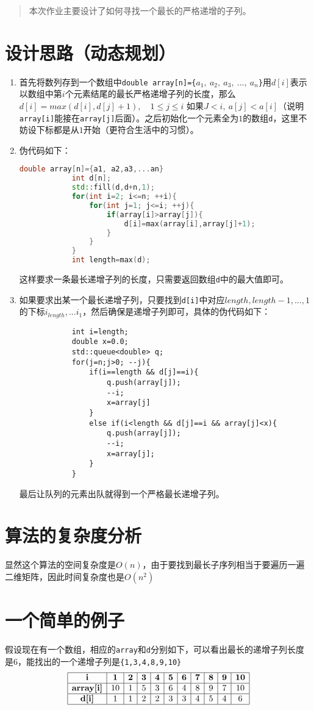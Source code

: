 \documentclass[UTF8]{ctexart}
\begin{document}
	
	\pagestyle{fancy}
	\fancyhead{}
	\rhead{\today}
	\begin{abstract}
		本次作业主要设计了如何寻找一个最长的严格递增的子列。
	\end{abstract}
	\section{设计思路（动态规划）}
	\begin{enumerate}
		\item 首先将数列存到一个数组中\texttt{double array[n]=\{$a_1,\ a_2,\ a_3,\ ...,\ a_n$\}}用$d[i]$表示以数组中第$i$个元素结尾的最长严格递增子列的长度，那么$d[i]=max(d[i],d[j]+1),\quad 1 \le j \le i$ 如果$J<i,\ a[j]<a[i]$（说明\texttt{array[i]}能接在\texttt{array[j]}后面）。之后初始化一个元素全为$1$的数组\texttt{d}，这里不妨设下标都是从$1$开始（更符合生活中的习惯）。
		\item 伪代码如下：
		\begin{lstlisting}[language=C++, caption={找到最长递增子列长度}, label={lst:operators}]
			double array[n]={a1, a2,a3,...an}
			int d[n];
			std::fill(d,d+n,1);
			for(int i=2; i<=n; ++i){
				for(int j=1; j<=i; ++j){
					if(array[i]>array[j]){
						d[i]=max(array[i],array[j]+1);
					}
				}
			}
			int length=max(d);
		\end{lstlisting}
		这样要求一条最长递增子列的长度，只需要返回数组\texttt{d}中的最大值即可。
		\item 如果要求出某一个最长递增子列，只要找到\texttt{d[i]}中对应$length,length-1,...,1$的下标$i_{length},...i_1$，然后确保是递增子列即可，具体的伪代码如下：
		\begin{lstlisting}
			int i=length;
			double x=0.0;
			std::queue<double> q;
			for(j=n;j>0; --j){
				if(i==length && d[j]==i){
					q.push(array[j]);
					--i;
					x=array[j]
				}
				else if(i<length && d[j]==i && array[j]<x){
					q.push(array[j]);
					--i;
					x=array[j];
				}
			}
		\end{lstlisting}
		最后让队列的元素出队就得到一个严格最长递增子列。
	\end{enumerate}
\section{算法的复杂度分析}
	显然这个算法的空间复杂度是$O(n)$，由于要找到最长子序列相当于要遍历一遍二维矩阵，因此时间复杂度也是$O(n^2)$
\section{一个简单的例子}
假设现在有一个数组，相应的\texttt{array}和\texttt{d}分别如下，可以看出最长的递增子列长度是6，能找出的一个递增子列是\texttt{\{1,3,4,8,9,10\}}
\[
\begin{array}{|c|c|c|c|c|c|c|c|c|c|c|c|}
	\hline
	\textbf{i}&\textbf{1} & \textbf{2} & \textbf{3} & \textbf{4} & \textbf{5} & \textbf{6} & \textbf{7} & \textbf{8} & \textbf{9} & \textbf{10} \\ \hline
	\textbf{array[i]}&10 & 1 & 5 & 3 & 6 & 4 & 8 & 9 & 7 & 10 \\ \hline
	\textbf{d[i]}& 1 & 1 & 2 & 2 & 3 & 3 & 4 & 5 & 4 & 6 \\ \hline
\end{array}
\]
\end{document}
